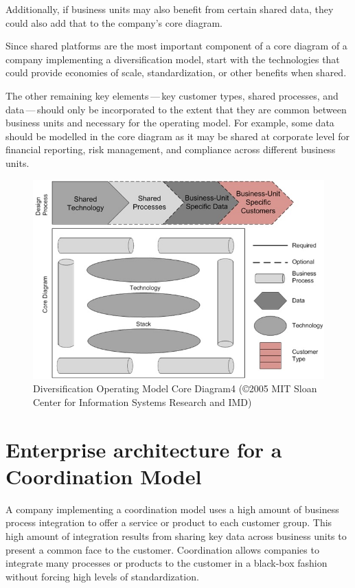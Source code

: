 Additionally, if business units may also benefit from certain shared data, they could also add that to the company's
core diagram.

Since shared platforms are the most important component of a core diagram of a company implementing a
diversification model, start with the technologies that could provide economies of scale, standardization,
or other benefits when shared.

The other remaining key elements\,---\,key customer types, shared processes, and data\,---\,should only be incorporated
to the extent that they are common between business units and necessary for the operating model.
For example, some data should be modelled in the core diagram as it may be shared at corporate level for
financial reporting, risk management, and compliance across different business units.

\begin{figure}[ht]
    \centering
    \includegraphics[width=\textwidth]{../images/diversification-operating-model-core-diagram4.jpg}
    \caption{Diversification Operating Model Core Diagram4 (©2005 MIT Sloan Center for Information Systems Research and IMD)}
    \label{fig:ekgmm-ea-diversification-operating-model-core-diagram4}
\end{figure}

\section*{Enterprise architecture for a Coordination Model}

A company implementing a coordination model uses a high amount of business process integration to offer a service
or product to each customer group.
This high amount of integration results from sharing key data across business units to present a common face to
the customer.
Coordination allows companies to integrate many processes or products to the customer in a black-box fashion without
forcing high levels of standardization.

